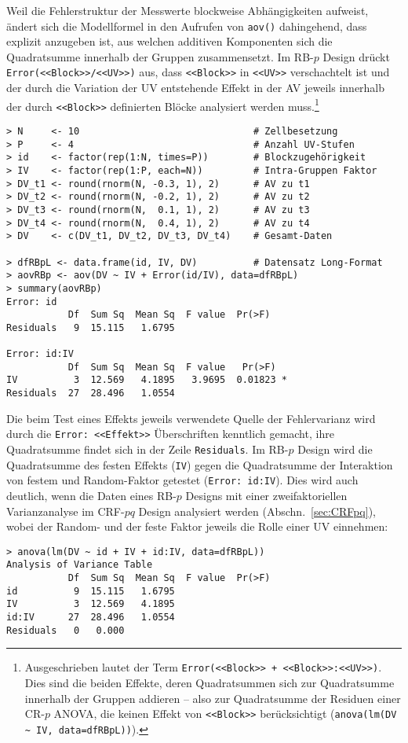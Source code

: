 Weil die Fehlerstruktur der Messwerte blockweise Abhängigkeiten aufweist, ändert sich die Modellformel in den Aufrufen von \lstinline!aov()! dahingehend, dass explizit anzugeben ist, aus welchen additiven Komponenten sich die Quadratsumme innerhalb der Gruppen zusammensetzt. Im RB-$p$ Design drückt \lstinline!Error(<<Block>>/<<UV>>)! aus, dass \lstinline!<<Block>>! in \lstinline!<<UV>>! verschachtelt ist und der durch die Variation der UV entstehende Effekt in der AV jeweils innerhalb der durch \lstinline!<<Block>>! definierten Blöcke analysiert werden muss.\footnote{Ausgeschrieben lautet der Term \lstinline!Error(<<Block>> + <<Block>>:<<UV>>)!. Dies sind die beiden Effekte, deren Quadratsummen sich zur Quadratsumme innerhalb der Gruppen addieren -- also zur Quadratsumme der Residuen einer CR-$p$ ANOVA, die keinen Effekt von \lstinline!<<Block>>! berücksichtigt (\lstinline!anova(lm(DV ~ IV, data=dfRBpL))!).}
\begin{lstlisting}
> N     <- 10                               # Zellbesetzung
> P     <- 4                                # Anzahl UV-Stufen
> id    <- factor(rep(1:N, times=P))        # Blockzugehörigkeit
> IV    <- factor(rep(1:P, each=N))         # Intra-Gruppen Faktor
> DV_t1 <- round(rnorm(N, -0.3, 1), 2)      # AV zu t1
> DV_t2 <- round(rnorm(N, -0.2, 1), 2)      # AV zu t2
> DV_t3 <- round(rnorm(N,  0.1, 1), 2)      # AV zu t3
> DV_t4 <- round(rnorm(N,  0.4, 1), 2)      # AV zu t4
> DV    <- c(DV_t1, DV_t2, DV_t3, DV_t4)    # Gesamt-Daten

> dfRBpL <- data.frame(id, IV, DV)          # Datensatz Long-Format
> aovRBp <- aov(DV ~ IV + Error(id/IV), data=dfRBpL)
> summary(aovRBp)
Error: id
           Df  Sum Sq  Mean Sq  F value  Pr(>F)
Residuals   9  15.115   1.6795

Error: id:IV
           Df  Sum Sq  Mean Sq  F value   Pr(>F)
IV          3  12.569   4.1895   3.9695  0.01823 *
Residuals  27  28.496   1.0554
\end{lstlisting}

Die beim Test eines Effekts jeweils verwendete Quelle der Fehlervarianz wird durch die \lstinline!Error: <<Effekt>>! Überschriften kenntlich gemacht, ihre Quadratsumme findet sich in der Zeile \lstinline!Residuals!. Im RB-$p$ Design wird die Quadratsumme des festen Effekts (\lstinline!IV!) gegen die Quadratsumme der Interaktion von festem und Random-Faktor getestet (\lstinline!Error: id:IV!). Dies wird auch deutlich, wenn die Daten eines RB-$p$ Designs mit einer zweifaktoriellen Varianzanalyse im CRF-$pq$ Design analysiert werden (Abschn.\ \ref{sec:CRFpq}), wobei der Random- und der feste Faktor jeweils die Rolle einer UV einnehmen:
\begin{lstlisting}
> anova(lm(DV ~ id + IV + id:IV, data=dfRBpL))
Analysis of Variance Table
           Df  Sum Sq  Mean Sq  F value  Pr(>F)
id          9  15.115   1.6795
IV          3  12.569   4.1895
id:IV      27  28.496   1.0554
Residuals   0   0.000
\end{lstlisting}

